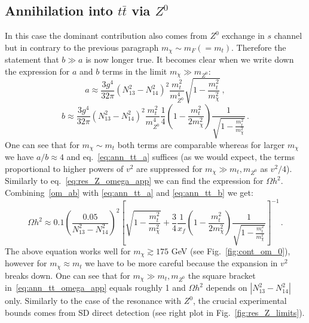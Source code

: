 \documentclass[12pt,twoside]{article}
\begin{document}
\subsection{Annihilation into $t\bar{t}$ via $ Z^0$}

In this case the dominant contribution also comes from $Z^0$ exchange in $s$ channel but in contrary to the previous paragraph $m_\chi\sim m_F(= m_t)$. Therefore the statement that $b\gg a$ is now longer true. It becomes clear when we write down the expression for $a$ and $b$ terms in the limit $m_\chi\gg m_{Z^0}$:
%
\begin{equation}
\label{eq:ann_tt_a}
a\approx
\frac{3g^4}{32\pi}(N_{13}^2-N_{14}^2)^2
\frac{m_t^2}{m_{Z^0}^4}
\sqrt{1-\frac{m_t^2}{m_{\chi}^2}}\,,
\end{equation}
%
%
\begin{equation}
\label{eq:ann_tt_b}
b\approx
\frac{3g^4}{32\pi}(N_{13}^2-N_{14}^2)^2
\frac{m_t^2}{m_{Z^0}^4}
\frac{1}{4}
\left(1-\frac{m_t^2}{2m_\chi^2}\right)
\frac{1}{\sqrt{1-\frac{m_t^2}{m_{\chi}^2}}}\,.
\end{equation}
%
One can see that for $m_\chi\sim m_t$ both terms are comparable whereas for larger $m_\chi$ we have $a/b\approx 4$ and eq.~\eqref{eq:ann_tt_a} suffices (as we would expect, the terms proportional to higher powers of $v^2$ are suppressed for $m_\chi\gg m_t,m_{Z^0}$ as $v^2/4$). Similarly to eq.~\eqref{eq:res_Z_omega_app} we can find the expression for $\Omega h^2$. Combining~\eqref{om_ab} with \eqref{eq:ann_tt_a} and \eqref{eq:ann_tt_b} we get:
%
\begin{equation}
\label{eq:ann_tt_omega_app}
\Omega h^2\approx 0.1\left(\frac{0.05}{N_{13}^2-N_{14}^2}\right)^2
\left[
\sqrt{1-\frac{m_t^2}{m_{\chi}^2}}+
\frac{3}{4}\frac{1}{x_f}
\left(1-\frac{m_t^2}{2m_{\chi}^2}\right)
\frac{1}{\sqrt{1-\frac{m_t^2}{m_{\chi}^2}}}
\right]^{-1}\,.
\end{equation}
%
The above equation works well for $m_\chi\gtrsim 175$ GeV (see Fig.~\ref{fig:cont_om_0}), however for $m_\chi\approx m_t$ we have to be more careful because the expansion in $v^2$ breaks down. One can see that for $m_\chi\gg m_t,m_{Z^0}$ the square bracket in~\eqref{eq:ann_tt_omega_app}  equals roughly 1 and $\Omega h^2$ depends on $|N_{13}^2-N_{14}^2|$ only. Similarly to the case of the resonance with $Z^0$, the crucial experimental bounds comes from SD direct detection (see right plot in Fig.~\ref{fig:res_Z_limits}).
\end{document}

